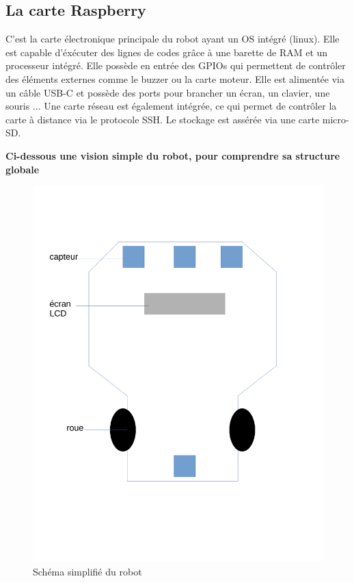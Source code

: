     \subsection{La carte Raspberry}

        C'est la carte électronique principale du robot ayant un OS intégré (linux). Elle est capable d'éxécuter des lignes de codes grâce à une barette de RAM et un processeur intégré. Elle possède en entrée des GPIOs qui permettent de contrôler des éléments externes comme le buzzer ou la carte moteur. Elle est alimentée via un câble USB-C et possède des ports pour brancher un écran, un clavier, une souris ... Une carte réseau est également intégrée, ce qui permet de contrôler la carte à distance via le protocole SSH. Le stockage est assérée via une carte micro-SD. 
        
        \textbf{Ci-dessous une vision simple du robot, pour comprendre sa structure globale}
        \begin{figure}[!h]
            \center 
            \includegraphics[width=0.9\linewidth]{imagesRapport/schema_simplifie_robot.pdf} 
            \caption{Schéma simplifié du robot}  
            \label{fig:analyse}
        \end{figure}
    
    
